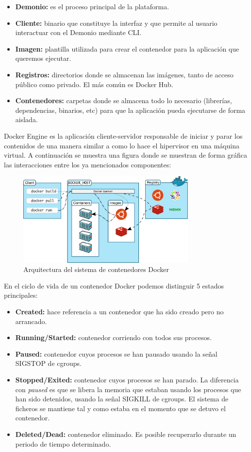 \begin{itemize}
	\item \textbf{Demonio:} es el proceso principal de la plataforma.
	\item \textbf{Cliente:} binario que constituye la interfaz y que permite al usuario interactuar con el Demonio mediante CLI.
	\item \textbf{Imagen:} plantilla utilizada para crear el contenedor para la aplicación que queremos ejecutar.
	\item \textbf{Registros:} directorios donde se almacenan las imágenes, tanto de acceso público como privado. El más común es Docker Hub.
	\item \textbf{Contenedores:} carpetas donde se almacena todo lo necesario (librerías, dependencias, binarios, etc) para que la aplicación pueda ejecutarse de forma aislada.
\end{itemize}

Docker Engine es la aplicación cliente-servidor responsable de iniciar y parar los contenidos de una manera similar a como lo hace el hipervisor en una máquina virtual. A continuación se muestra una figura donde se muestran de forma gráfica las interacciones entre los ya mencionados componentes:
\begin{figure}[h]
\centering
\includegraphics[width=0.8\textwidth]{../imgs/EdA/docker-arch.png}
\caption{Arquitectura del sistema de contenedores Docker}
\label{fig:docker-arch}
\end{figure}

En el ciclo de vida de un contenedor Docker podemos distinguir 5 estados principales:

\begin{itemize}
	\item \textbf{Created:} hace referencia a un contenedor que ha sido creado pero no arrancado.
	\item \textbf{Running/Started:} contenedor corriendo con todos sus procesos.
	\item \textbf{Paused:} contenedor cuyos procesos se han pausado usando la señal SIGSTOP de cgroups.
	\item \textbf{Stopped/Exited:} contenedor cuyos procesos se han parado. La diferencia con \textit{paused} es que se libera la memoria que estaban usando los procesos que han sido detenidos, usando la señal SIGKILL de cgroups. El sistema de ficheros se mantiene tal y como estaba en el momento que se detuvo el contenedor.
	\item \textbf{Deleted/Dead:} contenedor eliminado. Es posible recuperarlo durante un periodo de tiempo determinado.
\end{itemize}

